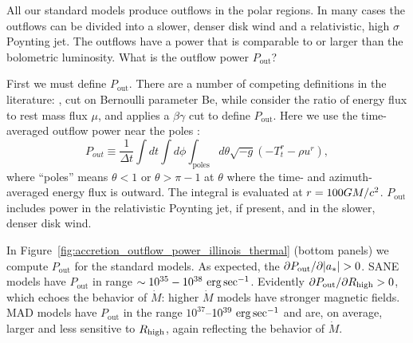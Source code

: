 All our standard models produce outflows in the polar regions.  In many cases the outflows can be divided into a slower, denser disk wind and a relativistic, high $\sigma$ Poynting jet.  The outflows have a power that is comparable to or larger than the bolometric luminosity.  What is the outflow power $P_\mathrm{out}$?


First we must define $P_\mathrm{out}$.  There are a number of competing definitions in the literature: \citet{refId0}, \citet{2014A&A...570A...7M} cut on  Bernoulli parameter Be, while \citet{10.1111/j.1365-2966.2012.22002.x} consider the ratio of energy flux to rest mass flux $\mu$, and  applies a $\beta\gamma$ cut to define $P_\mathrm{out}$.  Here we use the time-averaged outflow power near the poles :
\begin{equation}
  P_{out} \equiv \frac{1}{\Delta t}\int dt \int d\phi \int_\mathrm{poles} d\theta \sqrt{-g}\left(-T^{r}_{t}-\rho u^{r}\right),
\end{equation}
where ``poles'' means $\theta<1$ or $\theta>\pi-1$ at $\theta$ where the time- and azimuth-averaged energy flux is outward.  The integral is evaluated at $r=100GM/c^2$. $P_\mathrm{out}$ includes power in the relativistic Poynting jet, if present, and in the slower, denser disk wind.

In Figure~\ref{fig:accretion_outflow_power_illinois_thermal}
(bottom panels) we compute $P_\mathrm{out}$ for the standard models. As expected, the $\partial P_\mathrm{out}/\partial |a_*| > 0$. SANE models have $P_\mathrm{out}$ in range $\sim 10^{35}-10^{38} \,\,\mathrm{erg}\,\mathrm{sec}^{-1}$.  Evidently $\partial P_\mathrm{out}/\partial R_\mathrm{high} > 0$, which echoes the behavior of $\dot{M}$: higher $\dot{M}$ models have stronger magnetic fields. MAD models have $P_\mathrm{out}$ in the range $10^{37}$--$10^{39} \,\,\mathrm{erg}\,\mathrm{sec}^{-1}$ and are, on average, larger and less sensitive to $R_\mathrm{high}$, again reflecting the behavior of $\dot{M}$.


